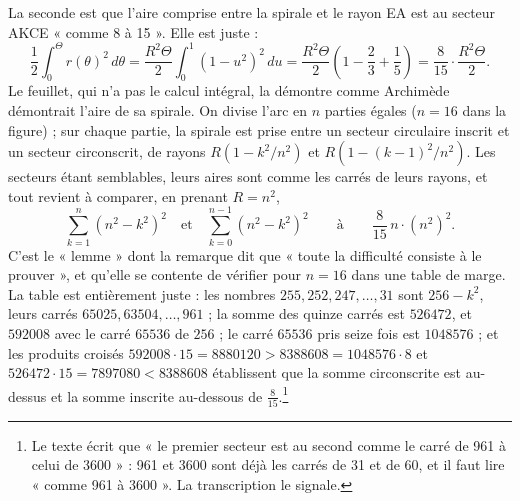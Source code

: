 \documentclass[11pt,a4paper]{article}
\begin{document}
La seconde est que l'aire comprise entre la spirale et le rayon EA est au
secteur AKCE « comme 8 à 15 ». Elle est juste :
\[
\frac12\int_0^\Theta r(\theta)^2\,d\theta
 = \frac{R^2\Theta}{2}\int_0^1 (1-u^2)^2\,du
 = \frac{R^2\Theta}{2}\left(1 - \frac23 + \frac15\right)
 = \frac{8}{15}\cdot\frac{R^2\Theta}{2}.
\]
Le feuillet, qui n'a pas le calcul intégral, la démontre comme Archimède
démontrait l'aire de sa spirale. On divise l'arc en $n$ parties égales ($n = 16$
dans la figure) ; sur chaque partie, la spirale est prise entre un secteur
circulaire inscrit et un secteur circonscrit, de rayons
$R(1 - k^2/n^2)$ et $R(1 - (k-1)^2/n^2)$. Les secteurs étant semblables, leurs
aires sont comme les carrés de leurs rayons, et tout revient à comparer, en
prenant $R = n^2$,
\[
\sum_{k=1}^{n}(n^2 - k^2)^2 \quad\text{et}\quad \sum_{k=0}^{n-1}(n^2 - k^2)^2
\qquad\text{à}\qquad \frac{8}{15}\,n \cdot (n^2)^2 .
\]
C'est le « lemme » dont la remarque dit que « toute la difficulté consiste à le
prouver », et qu'elle se contente de vérifier pour $n = 16$ dans une table de
marge. La table est entièrement juste : les nombres $255, 252, 247, \dots, 31$
sont $256 - k^2$, leurs carrés $65025, 63504, \dots, 961$ ; la somme des quinze
carrés est $526472$, et $592008$ avec le carré $65536$ de $256$ ; le carré
$65536$ pris seize fois est $1048576$ ; et les produits croisés
$592008 \cdot 15 = 8880120 > 8388608 = 1048576 \cdot 8$ et
$526472 \cdot 15 = 7897080 < 8388608$ établissent que la somme circonscrite est
au-dessus et la somme inscrite au-dessous de $\frac{8}{15}$.\footnote{Le texte
écrit que « le premier secteur est au second comme le carré de 961 à celui de
3600 » : 961 et 3600 sont déjà les carrés de 31 et de 60, et il faut lire
« comme 961 à 3600 ». La transcription le signale.}
\end{document}
